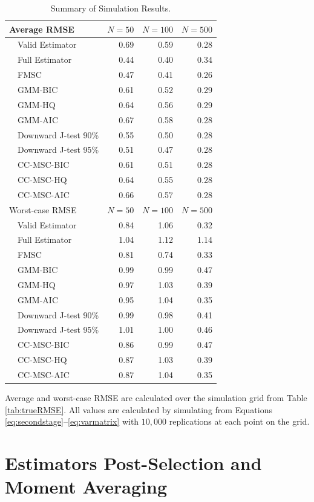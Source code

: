 \documentclass[12pt]{article}
\theoremstyle{definition}
\begin{document}
%
\begin{table}[!tbp]
\caption{Summary of Simulation Results.}
\label{tab:summary}
 \begin{center}
 \begin{tabular}{rlrrr}\hline\hline
\multicolumn{2}{l}{Average RMSE}&\multicolumn{1}{c}{$N=50$}&\multicolumn{1}{c}{$N=100$}&\multicolumn{1}{c}{$N=500$}\tabularnewline
\hline
&Valid Estimator&0.69&0.59&0.28\tabularnewline
&Full Estimator&0.44&0.40&0.34\tabularnewline
&FMSC&0.47&0.41&0.26\tabularnewline
&GMM-BIC&0.61&0.52&0.29\tabularnewline
&GMM-HQ&0.64&0.56&0.29\tabularnewline
&GMM-AIC&0.67&0.58&0.28\tabularnewline
&Downward J-test 90\%&0.55&0.50&0.28\tabularnewline
&Downward J-test 95\%&0.51&0.47&0.28\tabularnewline
&CC-MSC-BIC&0.61&0.51&0.28\tabularnewline
&CC-MSC-HQ&0.64&0.55&0.28\tabularnewline
&CC-MSC-AIC&0.66&0.57&0.28\tabularnewline
\hline\hline
\multicolumn{2}{l}{Worst-case RMSE}&\multicolumn{1}{c}{$N=50$}&\multicolumn{1}{c}{$N=100$}&\multicolumn{1}{c}{$N=500$}\tabularnewline
\hline
&Valid Estimator&0.84&1.06&0.32\tabularnewline
&Full Estimator&1.04&1.12&1.14\tabularnewline
&FMSC&0.81&0.74&0.33\tabularnewline
&GMM-BIC&0.99&0.99&0.47\tabularnewline
&GMM-HQ&0.97&1.03&0.39\tabularnewline
&GMM-AIC&0.95&1.04&0.35\tabularnewline
&Downward J-test 90\%&0.99&0.98&0.41\tabularnewline
&Downward J-test 95\%&1.01&1.00&0.46\tabularnewline
&CC-MSC-BIC&0.86&0.99&0.47\tabularnewline
&CC-MSC-HQ&0.87&1.03&0.39\tabularnewline
&CC-MSC-AIC&0.87&1.04&0.35\tabularnewline
\hline
\end{tabular}
\end{center}
\footnotesize
\begin{tablenotes}
	\item Average and worst-case RMSE are calculated over the simulation grid from Table \ref{tab:trueRMSE}. All values are calculated by simulating from Equations \ref{eq:secondstage}--\ref{eq:varmatrix} with $10,000$ replications at each point on the grid.
\end{tablenotes}
\end{table}







\section{Estimators Post-Selection and Moment Averaging}
\label{sec:avg}
\end{document}

